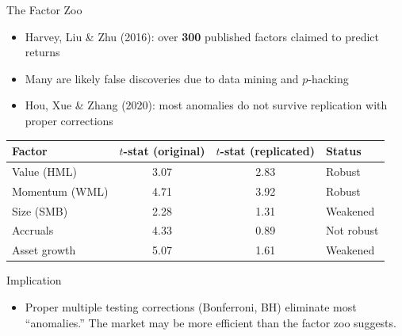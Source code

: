 \documentclass[9pt, aspectratio=169, t]{beamer}
\theoremstyle{definition}
\newenvironment{cminipage}[1]{%
    \par\noindent\hfill\begin{minipage}{#1}\ignorespaces
}{%
    \end{minipage}\hfill\null\par
}
\begin{document}
\begin{frame}{The Factor Zoo}
\begin{cminipage}{0.95\textwidth}
\begin{itemize}\setlength{\itemsep}{0pt}
    \item Harvey, Liu \& Zhu (2016): over \textbf{300} published factors claimed to predict returns
    \item Many are likely false discoveries due to data mining and $p$-hacking
    \item Hou, Xue \& Zhang (2020): most anomalies do not survive replication with proper corrections
\end{itemize}

\vspace{0.2cm}
\renewcommand{\arraystretch}{1.2}
\begin{center}
\small
\begin{tabular}{lccl}
\toprule
\textbf{Factor} & \textbf{$t$-stat (original)} & \textbf{$t$-stat (replicated)} & \textbf{Status} \\
\midrule
Value (HML) & 3.07 & 2.83 & Robust \\
Momentum (WML) & 4.71 & 3.92 & Robust \\
Size (SMB) & 2.28 & 1.31 & Weakened \\
Accruals & 4.33 & 0.89 & Not robust \\
Asset growth & 5.07 & 1.61 & Weakened \\
\bottomrule
\end{tabular}
\end{center}

\vspace{0.2cm}
\begin{alertblock}{Implication}
\begin{itemize}\setlength{\itemsep}{0pt}
    \item Proper multiple testing corrections (Bonferroni, BH) eliminate most ``anomalies.'' The market may be more efficient than the factor zoo suggests.
\end{itemize}
\end{alertblock}
\end{cminipage}
\end{frame}
\end{document}
